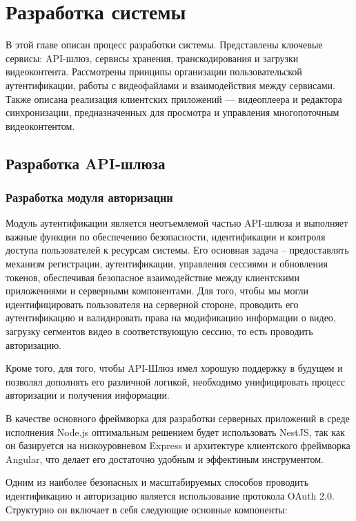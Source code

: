 \chapter{Разработка системы} \label{ch3}

	В этой главе описан процесс разработки системы. Представлены ключевые сервисы: API-шлюз, сервисы хранения, транскодирования и загрузки видеоконтента. Рассмотрены принципы организации пользовательской аутентификации, работы с видеофайлами и взаимодействия между сервисами. Также описана реализация клиентских приложений — видеоплеера и редактора синхронизации, предназначенных для просмотра и управления многопоточным видеоконтентом.

	\section{Разработка API-шлюза}

	\subsection{Разработка модуля авторизации}

	Модуль аутентификации является неотъемлемой частью API-шлюза и выполняет важные функции по обеспечению безопасности, идентификации и контроля доступа пользователей к ресурсам системы. Его основная задача – предоставлять механизм регистрации, аутентификации, управления сессиями и обновления токенов, обеспечивая безопасное взаимодействие между клиентскими приложениями и серверными компонентами. Для того, чтобы мы могли идентифицировать пользователя на серверной стороне, проводить его аутентификацию и валидировать права на модификацию информации о видео, загрузку сегментов видео в соответствующую сессию, то есть проводить авторизацию.

	Кроме того, для того, чтобы API-Шлюз имел хорошую поддержку в будущем и позволял дополнять его различной логикой, необходимо унифицировать процесс авторизации и получения информации.
	
	В качестве основного фреймворка для разработки серверных приложений в среде исполнения Node.js оптимальным решением будет использовать NestJS, так как он базируется на низкоуровневом Express и архитектуре клиентского фреймворка Angular, что делает его достаточно удобным и эффектиным инструментом.

	Одним из наиболее безопасных и масштабируемых способов проводить идентификацию и авторизацию является использование протокола OAuth 2.0.
	Структурно он включает в себя следующие основные компоненты:

